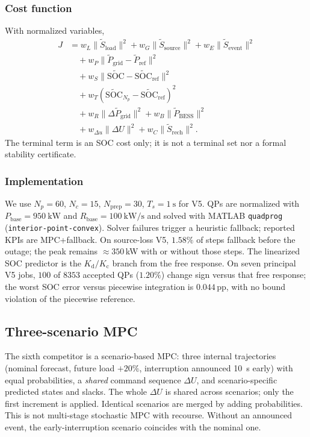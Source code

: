 \documentclass{ieeeaccess}
\begin{document}
\subsubsection{Cost function}
With normalized variables,
\begin{equation}
\label{eq:cost}
\begin{aligned}
J &= w_L\|\tilde{S}_{\mathrm{load}}\|^2
 + w_G\|\tilde{S}_{\mathrm{source}}\|^2
 + w_E\|\tilde{S}_{\mathrm{event}}\|^2 \\
&\quad
 + w_P\|\tilde{P}_{\mathrm{grid}}-\tilde{P}_{\mathrm{ref}}\|^2 \\
&\quad
 + w_S\|\tilde{\mathrm{SOC}}-\tilde{\mathrm{SOC}}_{\mathrm{ref}}\|^2 \\
&\quad
 + w_T(\tilde{\mathrm{SOC}}_{N_p}-\tilde{\mathrm{SOC}}_{\mathrm{ref}})^2 \\
&\quad
 + w_R\|\Delta\tilde{P}_{\mathrm{grid}}\|^2
 + w_B\|\tilde{P}_{\mathrm{BESS}}\|^2 \\
&\quad
 + w_{\Delta u}\|\Delta U\|^2
 + w_C\|\tilde{S}_{\mathrm{rech}}\|^2.
\end{aligned}
\end{equation}
The terminal term is an SOC cost only; it is not a terminal set nor a formal stability certificate.

\subsubsection{Implementation}
\label{sec:implementation}
We use $N_p=60$, $N_c=15$, $N_{\mathrm{prep}}=30$, $T_s=\SI{1}{\second}$ for V5. QPs are normalized with $P_{\mathrm{base}}=\SI{950}{\kilo\watt}$ and $R_{\mathrm{base}}=\SI{100}{\kilo\watt\per\second}$ and solved with MATLAB \texttt{quadprog} (\texttt{interior-point-convex}). Solver failures trigger a heuristic fallback; reported KPIs are MPC+fallback. On source-loss V5, $1.58\%$ of steps fallback before the outage; the peak remains $\approx 350$\,kW with or without those steps. The linearized SOC predictor is the $K_{\mathrm{d}}/K_{\mathrm{c}}$ branch from the free response. On seven principal V5 jobs, $100$ of $8353$ accepted QPs ($1.20\%$) change sign versus that free response; the worst SOC error versus piecewise integration is $0.044$\,pp, with no bound violation of the piecewise reference.

\subsection{Three-scenario MPC}
The sixth competitor is a scenario-based MPC: three internal trajectories (nominal forecast, future load ${+}20\%$, interruption announced \SI{10}{\second} early) with equal probabilities, a \emph{shared} command sequence $\Delta U$, and scenario-specific predicted states and slacks. The whole $\Delta U$ is shared across scenarios; only the first increment is applied. Identical scenarios are merged by adding probabilities. This is not multi-stage stochastic MPC with recourse. Without an announced event, the early-interruption scenario coincides with the nominal one.
\end{document}
